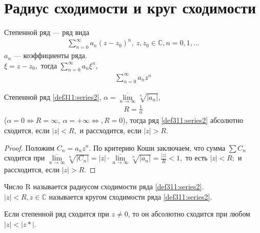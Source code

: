 \section{Радиус сходимости и круг сходимости}
\begin{definition}
  Степенной ряд --- ряд вида
  \begin{gather}
    \sum\limits_{n = 0}^{\infty} a_n(z - z_0)^n, \ z, z_0 \in \mathbb{C}, n = 0, 1, \dots
    \label{def311:series1}
  \end{gather}
  $a_n$ --- коэффициенты ряда. \\
  $\xi = z - z_0, $ тогда
  $\sum\limits_{n = 0}^{\infty} a_n \xi^n$,
  \begin{gather}
    \sum\limits_{n = 0}^{\infty} a_n z^n \label{def311:series2}
  \end{gather}
\end{definition}

\begin{theorem}
  \label{th311}
  Степенной ряд \eqref{def311:series2}, $\alpha = \overline{\lim\limits_{n \to
  \infty}} \sqrt[n]{|a_n|}$,
  \begin{gather}
    R = \frac{1}{\alpha} \label{def311:eq1}
  \end{gather}
  ($\alpha = 0 \Longleftrightarrow R = \infty, \
  \alpha = +\infty \Longleftrightarrow, R = 0$), тогда ряд \eqref{def311:series2}
  абсолютно сходится, если $|z| < R,$ и рассходится, если $|z| > R$.
\end{theorem}

\begin{proof}
  Положим $C_n = a_n z^n$. По критерию Коши заключаем, что сумма
  $\sum C_n$ сходится при $\overline{\lim\limits_{n \to \infty}} \sqrt[n]{|C_n|}
  = |z|\cdot \overline{\lim\limits_{n \to \infty}} \sqrt[n]{|a_n|} =
  \frac{|z|}{R} < 1,$ то есть $|z| < R;$ и рассходится, если $|z| > R$.
\end{proof}

\begin{definition}
  Число R называется радиусом сходимости ряда \eqref{def311:series2}. \\
  $|z| < R, z \in \mathbb{C}$ называется кругом сходимости ряда
  \eqref{def311:series2}.
\end{definition}

\begin{consequence}[1-ая т. Абеля]
  Если степенной ряд сходится при $z \not = 0$, то он абсолютно сходится при
  любом $|z| < |z*|$.
\end{consequence}


